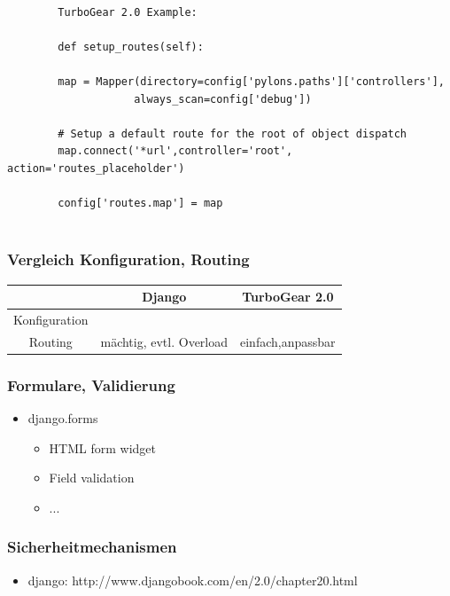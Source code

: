 \documentclass[
    t,
    smaller,
    compress,
]{beamer}
\begin{document}
	
	\begin{verbatim}
	
		TurboGear 2.0 Example:
	
		def setup_routes(self):
		
		map = Mapper(directory=config['pylons.paths']['controllers'],
		            always_scan=config['debug'])
		
		# Setup a default route for the root of object dispatch
		map.connect('*url',controller='root', action='routes_placeholder')

		config['routes.map'] = map
				
	\end{verbatim}
	
\begin{frame}
	\frametitle{Vergleich Konfiguration, Routing}
	
	
	\begin{table}[h]
		\begin{tabular}{|c|c|c|}
			\hline
			 & Django & TurboGear 2.0  \\ \hline
		  	Konfiguration &  &  \\ \hline
		  	Routing & \cellcolor{orange} mächtig, evtl. Overload & \cellcolor{green} einfach,anpassbar	   \\ \hline
		 \end{tabular}
	\end{table}

	
\end{frame}

\begin{frame}
  \frametitle{Formulare, Validierung}
  
  \begin{itemize}[<1->]
    \item django.forms
	 \begin{itemize}[<1->]
		\item HTML form widget
		\item Field validation
		\item ...
	\end{itemize}
  \end{itemize}

\end{frame}


\begin{frame}
  \frametitle{Sicherheitmechanismen}
  
  \begin{itemize}[<1->]
    \item django: http://www.djangobook.com/en/2.0/chapter20.html
    \end{itemize}

\end{frame}
\end{document}
